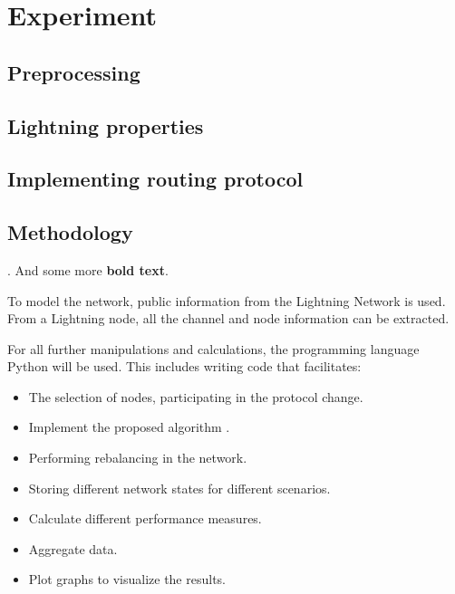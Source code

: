 \documentclass[final]{fhnwreport}       %
\begin{document}
\section{Experiment} \label{sec:method}
\subsection{Preprocessing}

\subsection{Lightning properties}

\subsection{Implementing routing protocol}

\subsection{Methodology}
. And some more \textbf{bold text}.

To model the network, public information from the Lightning Network is used. From a Lightning node, all the channel and node information can be extracted.

For all further manipulations and calculations, the programming language Python will be used. This includes writing code that facilitates: 
\begin{itemize}
  \item The selection of nodes, participating in the protocol change.
  \item Implement the proposed algorithm \cite[p.~3]{pickhardt_imbalance_2019}.
  \item Performing rebalancing in the network.
  \item Storing different network states for different scenarios.
  \item Calculate different performance measures.
  \item Aggregate data.
  \item Plot graphs to visualize the results.
\end{itemize}
\end{document}
